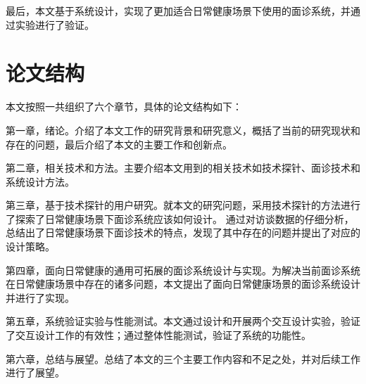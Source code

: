 最后，本文基于系统设计，实现了更加适合日常健康场景下使用的面诊系统，并通过实验进行了验证。





\section{论文结构}
本文按照一共组织了六个章节，具体的论文结构如下：

第一章，绪论。介绍了本文工作的研究背景和研究意义，概括了当前的研究现状和存在的问题，最后介绍了本文的主要工作和创新点。

第二章，相关技术和方法。主要介绍本文用到的相关技术如技术探针、面诊技术和系统设计方法。

第三章，基于技术探针的用户研究。就本文的研究问题，采用技术探针的方法进行了探索了日常健康场景下面诊系统应该如何设计。
通过对访谈数据的仔细分析，总结出了日常健康场景下面诊技术的特点，发现了其中存在的问题并提出了对应的设计策略。

第四章，面向日常健康的通用可拓展的面诊系统设计与实现。为解决当前面诊系统在日常健康场景中存在的诸多问题，本文提出了面向日常健康场景的面诊系统设计并进行了实现。

第五章，系统验证实验与性能测试。本文通过设计和开展两个交互设计实验，验证了交互设计工作的有效性；通过整体性能测试，验证了系统的功能性。

第六章，总结与展望。总结了本文的三个主要工作内容和不足之处，并对后续工作进行了展望。